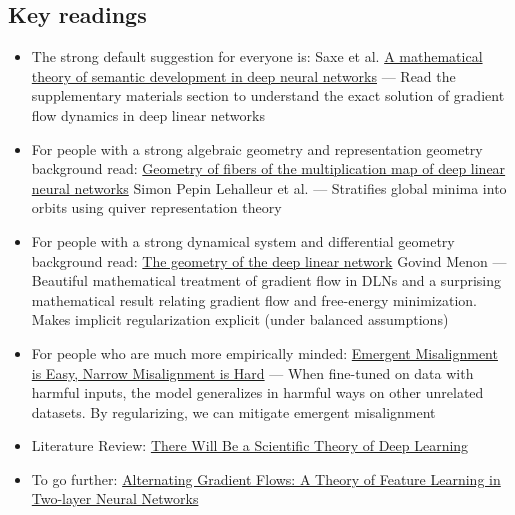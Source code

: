 \documentclass[11pt]{article}
\begin{document}
\subsection*{Key readings}
\begin{itemize}
  \item The strong default suggestion for everyone is: Saxe et al. \href{https://www.pnas.org/doi/10.1073/pnas.1820226116}{A mathematical theory of semantic development in deep neural networks} --- Read the supplementary materials section to understand the exact solution of gradient flow dynamics in deep linear networks
  \item For people with a strong algebraic geometry and representation geometry background read: \href{https://arxiv.org/abs/2411.19920}{Geometry of fibers of the multiplication map of deep linear neural networks} Simon Pepin Lehalleur et al. --- Stratifies global minima into orbits using quiver representation theory
  \item For people with a strong dynamical system and differential geometry background read: \href{https://arxiv.org/abs/2411.09004}{The geometry of the deep linear network} Govind Menon --- Beautiful mathematical treatment of gradient flow in DLNs and a surprising mathematical result relating gradient flow and free-energy minimization. Makes implicit regularization explicit (under balanced assumptions)
  \item For people who are much more empirically minded: \href{https://arxiv.org/abs/2602.07852}{Emergent Misalignment is Easy, Narrow Misalignment is Hard} --- When fine-tuned on data with harmful inputs, the model generalizes in harmful ways on other unrelated datasets. By regularizing, we can mitigate emergent misalignment
  \item Literature Review: \href{https://arxiv.org/abs/2604.21691}{There Will Be a Scientific Theory of Deep Learning}
  \item To go further: \href{https://arxiv.org/abs/2506.06489}{Alternating Gradient Flows: A Theory of Feature Learning in Two-layer Neural Networks}
\end{itemize}
\end{document}
